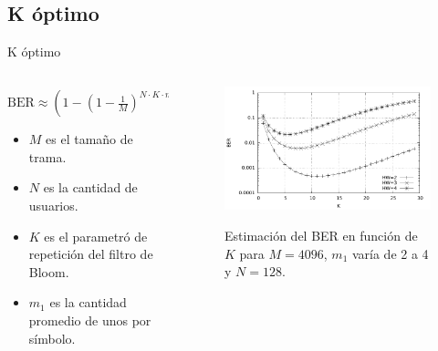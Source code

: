 \documentclass[aspectratio=169]{beamer}
\begin{document}
\subsection{K óptimo}

\begin{frame}{K óptimo}



\begin{columns}
  \begin{column}{0.40\textwidth}

  


$\text{BER} \approx \left(1-\left(1-\frac{1}{M}\right)^{N\cdot K\cdot m_1}\right)^K$
\vspace{0.5cm}

\begin{itemize}
 \item $M$ es el tamaño de trama.
 \item $N$ es la cantidad de usuarios.
 \item $K$ es el parametró de repetición del filtro de Bloom.
 \item $m_1$ es la cantidad promedio de unos por símbolo.
\end{itemize}

  \end{column}
  \begin{column}{0.60\textwidth}

 

\begin{figure}[!t]
  \centering
    \includegraphics[width=3.5in]{../graphs/calcK}
    
    Estimación del BER en función de $K$ para $M=4096$, $m_{1}$ varía de 2 a 4 y $N=128$.
\end{figure}

  \end{column}
\end{columns}


\end{frame}
\end{document}
